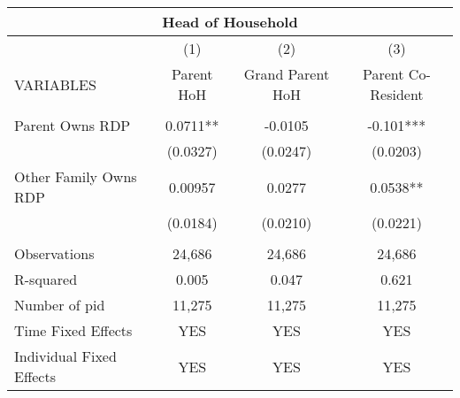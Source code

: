\begin{tabular}{lccc}
\multicolumn{4}{c}{Head of Household} \\ \hline
 & (1) & (2) & (3) \\
VARIABLES & Parent HoH & Grand Parent HoH & Parent Co-Resident \\ \hline
 &  &  &  \\
Parent Owns RDP & 0.0711** & -0.0105 & -0.101*** \\
 & (0.0327) & (0.0247) & (0.0203) \\
Other Family Owns RDP & 0.00957 & 0.0277 & 0.0538** \\
 & (0.0184) & (0.0210) & (0.0221) \\
 &  &  &  \\
Observations & 24,686 & 24,686 & 24,686 \\
R-squared & 0.005 & 0.047 & 0.621 \\
Number of pid & 11,275 & 11,275 & 11,275 \\
Time Fixed Effects & YES & YES & YES \\
 Individual Fixed Effects & YES & YES & YES \\ \hline
\end{tabular}

